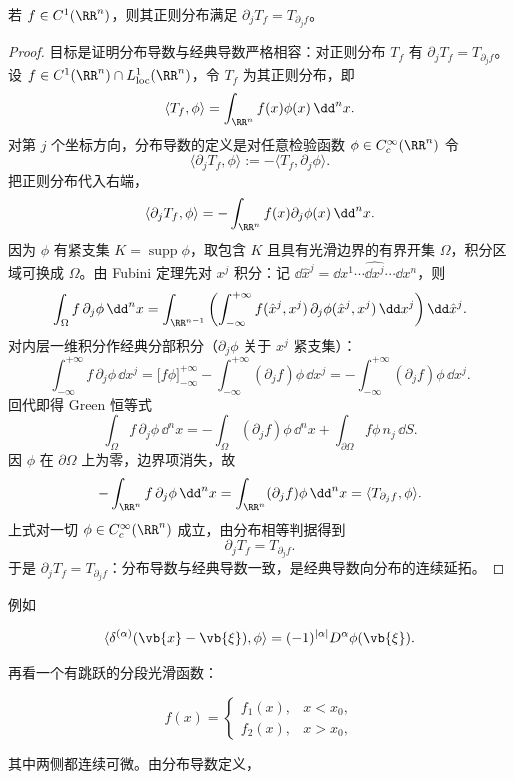 \begin{proposition}[分布导数与经典导数的相容性]
若 $f\in C^1(\RR^n)$，则其正则分布满足 $\partial_jT_f=T_{\partial_jf}$。
\end{proposition}
\begin{proof}
目标是证明分布导数与经典导数严格相容：对正则分布 $T_f$ 有 $\partial_jT_f=T_{\partial_jf}$。设 $f\in C^1(\RR^n)\cap L^1_{\mathrm{loc}}(\RR^n)$，令 $T_f$ 为其正则分布，即
\[
\langle T_f,\phi\rangle=\int_{\RR^n}f(x)\phi(x)\,\dd^nx.
\]
对第 $j$ 个坐标方向，分布导数的定义是对任意检验函数 $\phi\in C_c^\infty(\RR^n)$ 令
\[
\langle \partial_jT_f,\phi\rangle
:=-\langle T_f,\partial_j\phi\rangle.
\]
把正则分布代入右端，
\[
\langle \partial_jT_f,\phi\rangle
=-\int_{\RR^n}f(x)\partial_j\phi(x)\,\dd^nx.
\]
因为 $\phi$ 有紧支集 $K=\operatorname{supp}\phi$，取包含 $K$ 且具有光滑边界的有界开集 $\Omega$，积分区域可换成 $\Omega$。由 Fubini 定理先对 $x^j$ 积分：记 $\dd\hat x^j=\dd x^1\cdots\widehat{\dd x^j}\cdots\dd x^n$，则
\[
\int_\Omega f\,\partial_j\phi\,\dd^nx
=\int_{\RR^{n-1}}
\left(
\int_{-\infty}^{+\infty} f(\hat x^j,x^j)\,\partial_j\phi(\hat x^j,x^j)\,\dd x^j
\right)
\dd\hat x^j.
\]
对内层一维积分作经典分部积分（$\partial_j\phi$ 关于 $x^j$ 紧支集）：
\[
\int_{-\infty}^{+\infty} f\,\partial_j\phi\,\dd x^j
=\bigl[f\phi\bigr]_{-\infty}^{+\infty}
-\int_{-\infty}^{+\infty}(\partial_jf)\phi\,\dd x^j
=-\int_{-\infty}^{+\infty}(\partial_jf)\phi\,\dd x^j.
\]
回代即得 Green 恒等式
\[
\int_\Omega f\,\partial_j\phi\,\dd^nx
=-\int_\Omega(\partial_jf)\phi\,\dd^nx
+\int_{\partial\Omega}f\phi\,n_j\,\dd S.
\]
因 $\phi$ 在 $\partial\Omega$ 上为零，边界项消失，故
\[
-\int_{\RR^n} f\,\partial_j\phi\,\dd^nx
=\int_{\RR^n}(\partial_jf)\phi\,\dd^nx
=\langle T_{\partial_jf},\phi\rangle.
\]
上式对一切 $\phi\in C_c^\infty(\RR^n)$ 成立，由分布相等判据得到
\[
\partial_jT_f=T_{\partial_jf}.
\]
于是 $\partial_jT_f=T_{\partial_jf}$：分布导数与经典导数一致，是经典导数向分布的连续延拓。
\end{proof}


例如

\[
\langle\delta^{(\alpha)}(\vb{x}-\vb{\xi}),\phi\rangle
=(-1)^{|\alpha|}D^\alpha\phi(\vb{\xi}).
\]

再看一个有跳跃的分段光滑函数：

\[
f(x)=
\begin{cases}
f_1(x),&x<x_0,\\
f_2(x),&x>x_0,
\end{cases}
\]

其中两侧都连续可微。由分布导数定义，

